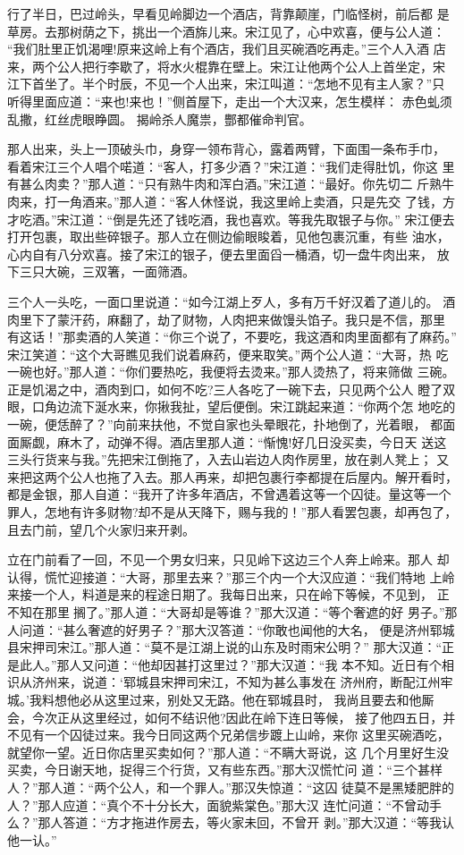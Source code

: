 行了半日，巴过岭头，早看见岭脚边一个酒店，背靠颠崖，门临怪树，前后都
是草房。去那树荫之下，挑出一个酒旆儿来。宋江见了，心中欢喜，便与公人道：
“我们肚里正饥渴哩!原来这岭上有个酒店，我们且买碗酒吃再走。”三个人入酒
店来，两个公人把行李歇了，将水火棍靠在壁上。宋江让他两个公人上首坐定，宋
江下首坐了。半个时辰，不见一个人出来，宋江叫道：“怎地不见有主人家？”只
听得里面应道：“来也!来也！”侧首屋下，走出一个大汉来，怎生模样：
赤色虬须乱撒，红丝虎眼睁圆。
揭岭杀人魔祟，酆都催命判官。

那人出来，头上一顶破头巾，身穿一领布背心，露着两臂，下面围一条布手巾，
看着宋江三个人唱个喏道：“客人，打多少酒？”宋江道：“我们走得肚饥，你这
里有甚么肉卖？”那人道：“只有熟牛肉和浑白酒。”宋江道：“最好。你先切二
斤熟牛肉来，打一角酒来。”那人道：“客人休怪说，我这里岭上卖酒，只是先交
了钱，方才吃酒。”宋江道：“倒是先还了钱吃酒，我也喜欢。等我先取银子与你。”
宋江便去打开包裹，取出些碎银子。那人立在侧边偷眼睃着，见他包裹沉重，有些
油水，心内自有八分欢喜。接了宋江的银子，便去里面舀一桶酒，切一盘牛肉出来，
放下三只大碗，三双箸，一面筛酒。

三个人一头吃，一面口里说道：“如今江湖上歹人，多有万千好汉着了道儿的。
酒肉里下了蒙汗药，麻翻了，劫了财物，人肉把来做馒头馅子。我只是不信，那里
有这话！”那卖酒的人笑道：“你三个说了，不要吃，我这酒和肉里面都有了麻药。”
宋江笑道：“这个大哥瞧见我们说着麻药，便来取笑。”两个公人道：“大哥，热
吃一碗也好。”那人道：“你们要热吃，我便将去烫来。”那人烫热了，将来筛做
三碗。正是饥渴之中，酒肉到口，如何不吃?三人各吃了一碗下去，只见两个公人
瞪了双眼，口角边流下涎水来，你揪我扯，望后便倒。宋江跳起来道：“你两个怎
地吃的一碗，便恁醉了？”向前来扶他，不觉自家也头晕眼花，扑地倒了，光着眼，
都面面厮觑，麻木了，动弹不得。酒店里那人道：“惭愧!好几日没买卖，今日天
送这三头行货来与我。”先把宋江倒拖了，入去山岩边人肉作房里，放在剥人凳上；
又来把这两个公人也拖了入去。那人再来，却把包裹行李都提在后屋内。解开看时，
都是金银，那人自道：“我开了许多年酒店，不曾遇着这等一个囚徒。量这等一个
罪人，怎地有许多财物?却不是从天降下，赐与我的！”那人看罢包裹，却再包了，
且去门前，望几个火家归来开剥。

立在门前看了一回，不见一个男女归来，只见岭下这边三个人奔上岭来。那人
却认得，慌忙迎接道：“大哥，那里去来？”那三个内一个大汉应道：“我们特地
上岭来接一个人，料道是来的程途日期了。我每日出来，只在岭下等候，不见到，
正不知在那里搁了。”那人道：“大哥却是等谁？”那大汉道：“等个奢遮的好
男子。”那人问道：“甚么奢遮的好男子？”那大汉答道：“你敢也闻他的大名，
便是济州郓城县宋押司宋江。”那人道：“莫不是江湖上说的山东及时雨宋公明？”
那大汉道：“正是此人。”那人又问道：“他却因甚打这里过？”那大汉道：“我
本不知。近日有个相识从济州来，说道：‘郓城县宋押司宋江，不知为甚么事发在
济州府，断配江州牢城。’我料想他必从这里过来，别处又无路。他在郓城县时，
我尚且要去和他厮会，今次正从这里经过，如何不结识他?因此在岭下连日等候，
接了他四五日，并不见有一个囚徒过来。我今日同这两个兄弟信步踱上山岭，来你
这里买碗酒吃，就望你一望。近日你店里买卖如何？”那人道：“不瞒大哥说，这
几个月里好生没买卖，今日谢天地，捉得三个行货，又有些东西。”那大汉慌忙问
道：“三个甚样人？”那人道：“两个公人，和一个罪人。”那汉失惊道：“这囚
徒莫不是黑矮肥胖的人？”那人应道：“真个不十分长大，面貌紫棠色。”那大汉
连忙问道：“不曾动手么？”那人答道：“方才拖进作房去，等火家未回，不曾开
剥。”那大汉道：“等我认他一认。”

